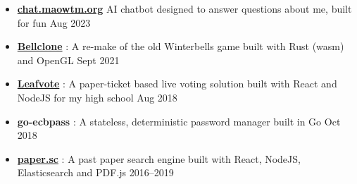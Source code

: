   \begin{itemize}
    \item \href{https://chat.maowtm.org}{\textbf{\color{link}chat.maowtm.org}}  \dashdiv{} AI chatbot designed to answer questions about me, built for fun \dashdiv{} Aug 2023



    \item \href{https://bellclone.maowtm.org/}{\color{link}\textbf{Bellclone}} : A re-make of the old Winterbells game built with Rust (wasm) and OpenGL \dashdiv{} Sept 2021

    \item \href{https://leafvote.mww.moe}{\color{link}\textbf{Leafvote}} : A paper-ticket based live voting solution built with React and NodeJS for my high school \dashdiv{} Aug 2018


    \item \textbf{go-ecbpass} : A stateless, deterministic password manager built in Go \dashdiv{} Oct 2018

    \item \href{https://paper.sc}{\color{link}\textbf{paper.sc}} : A past paper search engine built with React, NodeJS, Elasticsearch and PDF.js \dashdiv{} 2016--2019



  \end{itemize}


